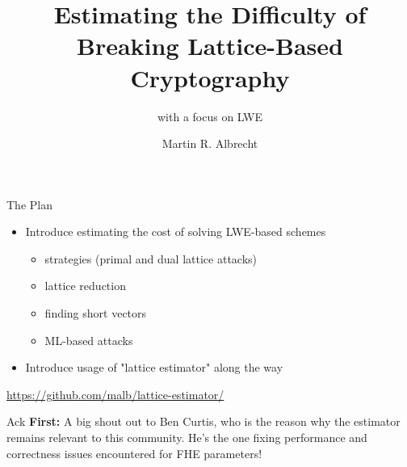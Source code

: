 \documentclass[table,10pt,aspectratio=169]{beamer}
\institute{King's College London \& SandboxAQ}
\author{Martin R. Albrecht}
\date{}
\title{Estimating the Difficulty of Breaking Lattice-Based Cryptography}
\subtitle{with a focus on LWE}
\begin{document}
\maketitle

\begin{frame}[label={sec:org382fc8f}]{The Plan}
\begin{itemize}
\item Introduce estimating the cost of solving LWE-based schemes
\begin{itemize}
\item strategies (primal and dual lattice attacks)
\item lattice reduction
\item finding short vectors
\item ML-based attacks
\end{itemize}
\item Introduce usage of "lattice estimator" along the way
\end{itemize}

\begin{alertblock}{}
\begin{center}
\url{https://github.com/malb/lattice-estimator/}
\end{center}
\end{alertblock}
\end{frame}

\begin{frame}[label={sec:org3351bee}]{Ack}
\textbf{First:} A big shout out to Ben Curtis, who is the reason why the estimator remains relevant to this community. He's the one fixing performance and correctness issues encountered for FHE parameters!
\end{frame}
\end{document}
